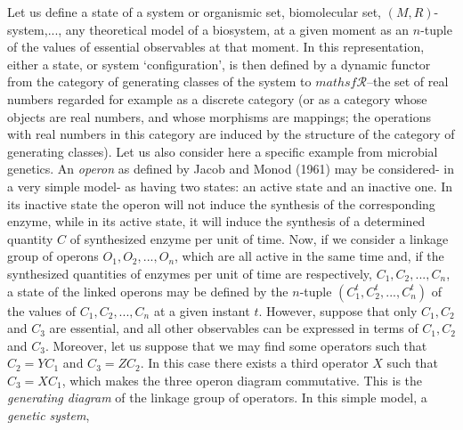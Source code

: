 \documentclass[12pt]{article}
\theoremstyle{plain}
\theoremstyle{definition}
\numberwithin{equation}{section}
\newcommand{\R}{\mathcal R}
\newcommand{\<}{{\langle}}
\begin{document}
 Let us define a state of a system or organismic set, biomolecular set, $(M,R)$-system,..., any theoretical model of a biosystem, at a given moment as an $n$-tuple of the values of essential observables at that moment. In this representation, either a state, or system `configuration', is then defined by a dynamic functor from the category of generating classes of the system to $mathsf{\R}$--the set of real numbers regarded for example as a discrete category (or as a category whose objects are real numbers, and whose morphisms are mappings; the operations with real numbers in this category are induced by the structure of the category of generating classes). Let us also consider here a specific example from microbial genetics. An \emph{operon} as defined by Jacob and Monod (1961) may be considered- in a very simple model- as having two states: an active state and an inactive one. In its inactive state the operon will not induce the synthesis of the corresponding enzyme, while in its active state, it will induce the synthesis of a determined quantity $C$ of synthesized enzyme per unit of time. Now, if we consider a linkage group of operons 
$O_1, O_2, . . ., O_n$,  which are all active in the same time and, if the synthesized quantities of enzymes per unit of time are respectively, $C_1, C_2,..., C_n$, a state of the linked operons may be defined by the $n$-tuple $(C^t_1, C^t_2, . . ., C^t_n)$ of the values of $C_1, C_2,..., C_n$ at a given instant $t$. However, suppose that only $C_1, C_2$ and $C_3$ are essential, and all other observables can be expressed in terms of $C_1, C_2$ and $C_3$. Moreover, let us suppose that we may find some operators such that $C_2 =YC_1$ and $C_3 = ZC_2$. In this case there exists a third operator $X$ such that $C_3 = X C_1$, which makes the three operon diagram commutative.
This is the \emph{generating diagram} of the linkage group of operators. In this simple model, a \emph{genetic system},
\end{document}
